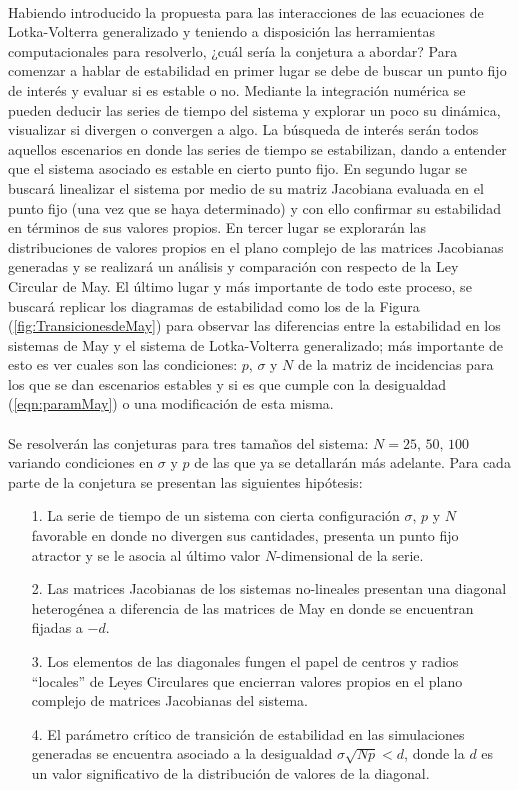 \\
Habiendo introducido la propuesta para las interacciones de las ecuaciones de Lotka-Volterra generalizado y teniendo a disposición las herramientas computacionales para resolverlo, ¿cuál sería la conjetura a abordar? Para comenzar a hablar de estabilidad en primer lugar se debe de buscar un punto fijo de interés y evaluar si es estable o no. Mediante la integración numérica se pueden deducir las series de tiempo del sistema y explorar un poco su dinámica, visualizar si divergen o convergen a algo. La búsqueda de interés serán todos aquellos escenarios en donde las series de tiempo se estabilizan, dando a entender que el sistema asociado es estable en cierto punto fijo. En segundo lugar se buscará linealizar el sistema por medio de su matriz Jacobiana evaluada en el punto fijo (una vez que se haya determinado) y con ello confirmar su estabilidad en términos de sus valores propios.
\newpage
En tercer lugar se explorarán las distribuciones de valores propios en el plano complejo de las matrices Jacobianas generadas y se realizará un análisis y comparación con respecto de la Ley Circular de May. El último lugar y más importante de todo este proceso, se buscará replicar los diagramas de estabilidad como los de la Figura (\ref{fig:TransicionesdeMay}) para observar las diferencias entre la estabilidad en los sistemas de May y el sistema de Lotka-Volterra generalizado; más importante de esto es ver cuales son las condiciones: $p$, $\sigma$ y $N$ de la matriz de incidencias para los que se dan escenarios estables y si es que cumple con la desigualdad (\ref{eqn:paramMay}) o una modificación de esta misma.
\\
\\
Se resolverán las conjeturas para tres tamaños del sistema: $N=25,\,50,\, 100$ variando condiciones en $\sigma$ y $p$ de las que ya se detallarán más adelante. Para cada parte de la conjetura se presentan las siguientes hipótesis:
\begin{itemize}
	\item[1.] La serie de tiempo de un sistema con cierta configuración $\sigma$, $p$ y $N$ favorable en donde no divergen sus cantidades, presenta un punto fijo atractor y se le asocia al último valor $N$-dimensional de la serie. %
	\item[2.] Las matrices Jacobianas de los sistemas no-lineales presentan una diagonal heterogénea a diferencia de las matrices de May en donde se encuentran fijadas a $-d$.
	\item[3.] Los elementos de las diagonales fungen el papel de centros y radios ``locales'' de Leyes Circulares que encierran valores propios en el plano complejo de matrices Jacobianas del sistema.
	\item[4.] El parámetro crítico de transición de estabilidad en las simulaciones generadas se encuentra asociado a la desigualdad $\sigma\sqrt{Np}<d$, donde la $d$ es un valor significativo de la distribución de valores de la diagonal.
\end{itemize}
